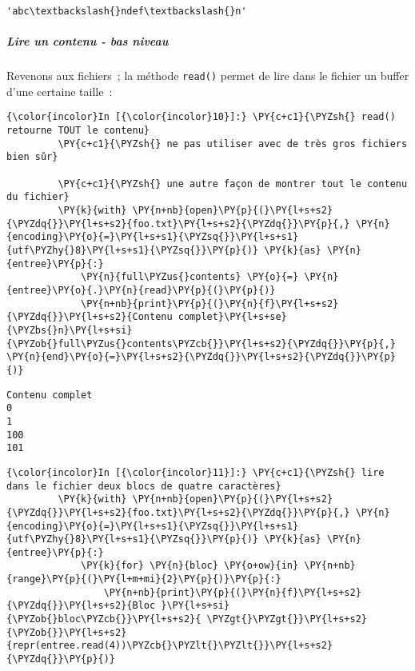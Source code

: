     \begin{Verbatim}[commandchars=\\\{\}]
'abc\textbackslash{}ndef\textbackslash{}n'

    \end{Verbatim}

    \hypertarget{lire-un-contenu---bas-niveau}{%
\subparagraph{Lire un contenu - bas
niveau}\label{lire-un-contenu---bas-niveau}}

    Revenons aux fichiers~; la méthode \texttt{read()} permet de lire dans
le fichier un buffer d'une certaine taille~:

    \begin{Verbatim}[commandchars=\\\{\}]
{\color{incolor}In [{\color{incolor}10}]:} \PY{c+c1}{\PYZsh{} read() retourne TOUT le contenu}
         \PY{c+c1}{\PYZsh{} ne pas utiliser avec de très gros fichiers bien sûr}
         
         \PY{c+c1}{\PYZsh{} une autre façon de montrer tout le contenu du fichier}
         \PY{k}{with} \PY{n+nb}{open}\PY{p}{(}\PY{l+s+s2}{\PYZdq{}}\PY{l+s+s2}{foo.txt}\PY{l+s+s2}{\PYZdq{}}\PY{p}{,} \PY{n}{encoding}\PY{o}{=}\PY{l+s+s1}{\PYZsq{}}\PY{l+s+s1}{utf\PYZhy{}8}\PY{l+s+s1}{\PYZsq{}}\PY{p}{)} \PY{k}{as} \PY{n}{entree}\PY{p}{:}
             \PY{n}{full\PYZus{}contents} \PY{o}{=} \PY{n}{entree}\PY{o}{.}\PY{n}{read}\PY{p}{(}\PY{p}{)}
             \PY{n+nb}{print}\PY{p}{(}\PY{n}{f}\PY{l+s+s2}{\PYZdq{}}\PY{l+s+s2}{Contenu complet}\PY{l+s+se}{\PYZbs{}n}\PY{l+s+si}{\PYZob{}full\PYZus{}contents\PYZcb{}}\PY{l+s+s2}{\PYZdq{}}\PY{p}{,} \PY{n}{end}\PY{o}{=}\PY{l+s+s2}{\PYZdq{}}\PY{l+s+s2}{\PYZdq{}}\PY{p}{)}
\end{Verbatim}


    \begin{Verbatim}[commandchars=\\\{\}]
Contenu complet
0
1
100
101

    \end{Verbatim}

    \begin{Verbatim}[commandchars=\\\{\}]
{\color{incolor}In [{\color{incolor}11}]:} \PY{c+c1}{\PYZsh{} lire dans le fichier deux blocs de quatre caractères}
         \PY{k}{with} \PY{n+nb}{open}\PY{p}{(}\PY{l+s+s2}{\PYZdq{}}\PY{l+s+s2}{foo.txt}\PY{l+s+s2}{\PYZdq{}}\PY{p}{,} \PY{n}{encoding}\PY{o}{=}\PY{l+s+s1}{\PYZsq{}}\PY{l+s+s1}{utf\PYZhy{}8}\PY{l+s+s1}{\PYZsq{}}\PY{p}{)} \PY{k}{as} \PY{n}{entree}\PY{p}{:}
             \PY{k}{for} \PY{n}{bloc} \PY{o+ow}{in} \PY{n+nb}{range}\PY{p}{(}\PY{l+m+mi}{2}\PY{p}{)}\PY{p}{:}
                 \PY{n+nb}{print}\PY{p}{(}\PY{n}{f}\PY{l+s+s2}{\PYZdq{}}\PY{l+s+s2}{Bloc }\PY{l+s+si}{\PYZob{}bloc\PYZcb{}}\PY{l+s+s2}{ \PYZgt{}\PYZgt{}}\PY{l+s+s2}{\PYZob{}}\PY{l+s+s2}{repr(entree.read(4))\PYZcb{}\PYZlt{}\PYZlt{}}\PY{l+s+s2}{\PYZdq{}}\PY{p}{)}
\end{Verbatim}


